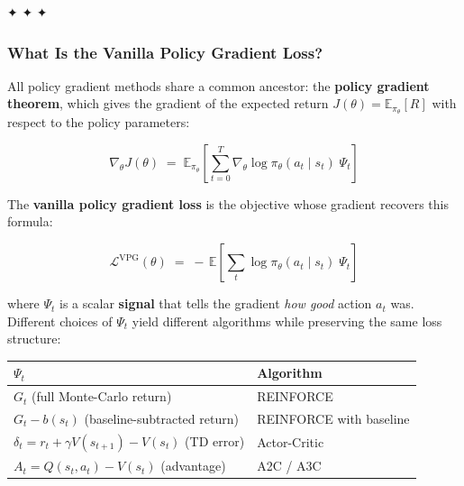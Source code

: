 \documentclass[11pt]{article}
\newcounter{none}
\begin{document}
✦ ✦ ✦

    \label{vanilla-pg-loss}

\subsubsection{What Is the Vanilla Policy Gradient
Loss?}\label{what-is-the-vanilla-policy-gradient-loss}

All policy gradient methods share a common ancestor: the \textbf{policy
gradient theorem}, which gives the gradient of the expected return
\(J(\theta) = \mathbb{E}_{\pi_\theta}[R]\) with respect to the policy
parameters:

\[\nabla_\theta J(\theta) \;=\; \mathbb{E}_{\pi_\theta}\!\left[\sum_{t=0}^{T}\nabla_\theta \log\pi_\theta(a_t \mid s_t)\;\Psi_t\right]\]

The \textbf{vanilla policy gradient loss} is the objective whose
gradient recovers this formula:

\[\boxed{\;\mathcal{L}^{\text{VPG}}(\theta) \;=\; -\,\mathbb{E}\!\left[\sum_{t}\log\pi_\theta(a_t \mid s_t)\;\Psi_t\right]\;}\]

where \(\Psi_t\) is a scalar \textbf{signal} that tells the gradient
\emph{how good} action \(a_t\) was. Different choices of \(\Psi_t\)
yield different algorithms while preserving the same loss structure:

{\def\LTcaptype{none} %
\begin{longtable}[]{@{}
  >{\raggedright\arraybackslash}p{}
  >{\raggedright\arraybackslash}p{}@{}}
\toprule\noalign{}
\begin{minipage}[b]{\linewidth}\raggedright
\(\Psi_t\)
\end{minipage} & \begin{minipage}[b]{\linewidth}\raggedright
Algorithm
\end{minipage} \\
\midrule\noalign{}
\endhead
\bottomrule\noalign{}
\endlastfoot
\(G_t\) (full Monte-Carlo return) & REINFORCE \\
\(G_t - b(s_t)\) (baseline-subtracted return) & REINFORCE with
baseline \\
\(\delta_t = r_t + \gamma V(s_{t+1}) - V(s_t)\) (TD error) &
Actor-Critic \\
\(A_t = Q(s_t, a_t) - V(s_t)\) (advantage) & A2C / A3C \\
\end{longtable}
}
\end{document}
